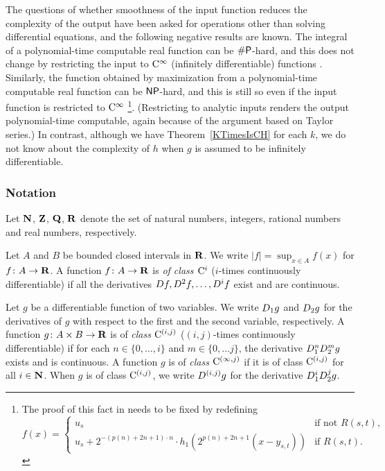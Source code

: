 The questions of whether smoothness of the input function 
reduces the complexity of the output
have been asked for operations other than solving differential equations, 
and the following negative results are known. 
The integral of a polynomial-time computable real function 
can be $\mathsf{\#P}$-hard, and this does not change 
by restricting the input to 
$\mathrm C ^\infty$ (infinitely differentiable) functions
\cite[Theorem~5.33]{ko1991complexity}. 
Similarly, the function obtained by maximization 
from a polynomial-time computable real function 
can be $\mathsf{NP}$-hard, and this is still so
even if the input function is restricted to $\mathrm C ^\infty$ 
\cite[Theorem~3.7]{ko1991complexity}%
\footnote{%
The proof of this fact in \cite[Theorem 3.7]{ko1991complexity}
needs to be fixed by redefining 
\[f(x) = 
\begin{cases}
 u_s & \text{if not } R(s,t), \\
 u_s + 2^{-(p(n)+2n+1)\cdot n} \cdot h_1(2^{p(n)+2n+1} (x - y_{s,t})) & \text{if } R(s,t). 
\end{cases}\]
}. 
(Restricting to analytic inputs 
renders the output polynomial-time computable, 
again because of the argument based on Taylor series.)
In contrast, 
although we have Theorem~\ref{KTimesIsCH} for each $k$, 
we do not know about the complexity of 
$h$ when $g$ is assumed to be infinitely differentiable. 

\subsubsection*{Notation}
Let $\mathbf N$, $\mathbf Z$, $\mathbf Q$, $\mathbf R$ denote the set of natural numbers,
integers,
rational numbers and 
real numbers, respectively.

Let $A$ and $B$ be bounded closed intervals in $\mathbf R$.
We write $|f| = \sup_{x \in A} f(x)$ for $f \colon A \to \mathbf R$.
A function $f \colon A \to \mathbf R$ is \emph{of class $\mathrm C^i$}
($i$-times continuously differentiable)
if all the derivatives $D f, D^2 f, \dots, D^i f$ exist and are continuous.

Let $g$ be a differentiable function of two variables. 
We write $D _1 g$ and $D _2 g$ for the derivatives of $g$ 
with respect to the first and the second variable,
respectively.
A function $g \colon A \times B \to \mathbf R$ is of \emph{class $\mathrm C^{(i, j)}$}
($(i, j)$-times continuously  differentiable)
if for each $n \in \{0, \dots, i\}$ and $m \in \{0, \dots j\}$,
the derivative $D_1^n D_2^m g$ exists and is continuous.
A function $g$ is of \emph{class $\mathrm C^{(\infty, j)}$}
if it is of class $\mathrm C^{(i, j)}$ for all $i \in \mathbf N$.
When $g$ is of class $\mathrm C^{(i,j)}$,
we write $D^{(i,j)}g$ for the derivative $D_1^i D_2^j g$.
